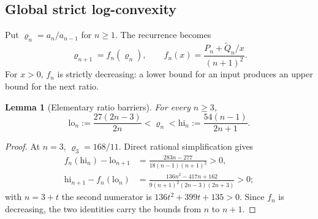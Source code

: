\documentclass[11pt,letterpaper]{article}
\newtheorem{lemma}[theorem]{Lemma}
\theoremstyle{remark}\newtheorem{remark}[theorem]{Remark}
\newcounter{l7gtrsavedeq}
\begin{document}
\subsection{Global strict log-convexity}\label{l7g:hp:sec:ratios}
Put $\varrho_n=a_n/a_{n-1}$ for $n\ge1$. The recurrence becomes
\begin{equation}\label{l7g:hp:eq:rmap}
 \varrho_{n+1}=f_n(\varrho_n),\qquad
 f_n(x)=\frac{P_n+\widetilde Q_n/x}{(n+1)^2}.
\end{equation}
For $x>0$, $f_n$ is strictly decreasing: a lower bound for an input
produces an upper bound for the next ratio.

\begin{lemma}[Elementary ratio barriers]\label{l7g:hp:lem:basicbarriers}
For every $n\ge3$,
\begin{equation}\label{l7g:hp:eq:basicbarriers}
 \mathrm{lo}_n:=\frac{27(2n-3)}{2n}<\varrho_n<
 \mathrm{hi}_n:=\frac{54(n-1)}{2n+1}.
\end{equation}
\end{lemma}
\begin{proof}
At $n=3$, $\varrho_3=168/11$. Direct rational simplification gives
\begin{align}
 f_n(\mathrm{hi}_n)-\mathrm{lo}_{n+1}
 &=\frac{283n-277}{18(n-1)(n+1)^2}>0,\label{l7g:hp:eq:basiclower}\\
 \mathrm{hi}_{n+1}-f_n(\mathrm{lo}_n)
 &=\frac{136n^2-417n+162}{9(n+1)^2(2n-3)(2n+3)}>0;\label{l7g:hp:eq:basicupper}
\end{align}
with $n=3+t$ the second numerator is $136t^2+399t+135>0$. Since $f_n$ is
decreasing, the two identities carry the bounds from $n$ to $n+1$.
\end{proof}
\end{document}
